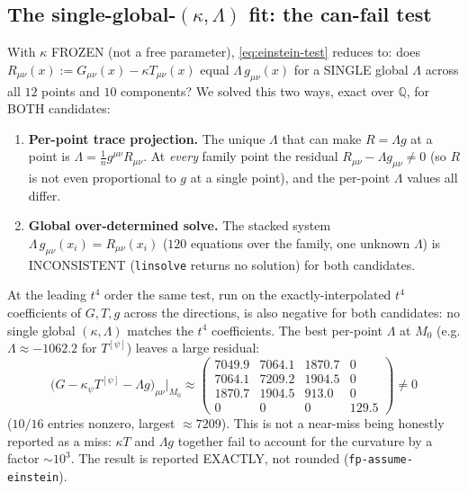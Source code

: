 \subsection{The single-global-$(\kappa,\Lambda)$ fit: the can-fail test}

With $\kappa$ FROZEN (not a free parameter), \eqref{eq:einstein-test} reduces to: does
$R_{\mu\nu}(x):=G_{\mu\nu}(x)-\kappa T_{\mu\nu}(x)$ equal $\Lambda\,g_{\mu\nu}(x)$ for a
SINGLE global $\Lambda$ across all $12$ points and $10$ components? We solved this two
ways, exact over $\mathbb{Q}$, for BOTH candidates:
\begin{enumerate}
\item \textbf{Per-point trace projection.} The unique $\Lambda$ that can make
  $R=\Lambda g$ at a point is $\Lambda=\tfrac1n g^{\mu\nu}R_{\mu\nu}$. At \emph{every}
  family point the residual $R_{\mu\nu}-\Lambda g_{\mu\nu}\neq0$ (so $R$ is not even
  proportional to $g$ at a single point), and the per-point $\Lambda$ values all differ.
\item \textbf{Global over-determined solve.} The stacked system $\Lambda\,g_{\mu\nu}(x_i)
  =R_{\mu\nu}(x_i)$ ($120$ equations over the family, one unknown $\Lambda$) is
  INCONSISTENT (\texttt{linsolve} returns no solution) for both candidates.
\end{enumerate}
At the leading $t^4$ order the same test, run on the exactly-interpolated $t^4$
coefficients of $G,T,g$ across the directions, is also negative for both candidates: no
single global $(\kappa,\Lambda)$ matches the $t^4$ coefficients. The best per-point
$\Lambda$ at $M_0$ (e.g. $\Lambda\approx-1062.2$ for $T^{[\psi]}$) leaves a large
residual:
\begin{equation}
  \big(G-\kappa_\psi T^{[\psi]}-\Lambda g\big)_{\mu\nu}\big|_{M_0}\approx
  \begin{pmatrix}
    7049.9 & 7064.1 & 1870.7 & 0\\
    7064.1 & 7209.2 & 1904.5 & 0\\
    1870.7 & 1904.5 & 913.0 & 0\\
    0 & 0 & 0 & 129.5
  \end{pmatrix}\neq0
  \label{eq:residual}
\end{equation}
($10/16$ entries nonzero, largest $\approx7209$). This is not a near-miss being honestly
reported as a miss: $\kappa T$ and $\Lambda g$ together fail to account for the curvature
by a factor $\sim10^3$. The result is reported EXACTLY, not rounded
(\texttt{fp-assume-einstein}).

